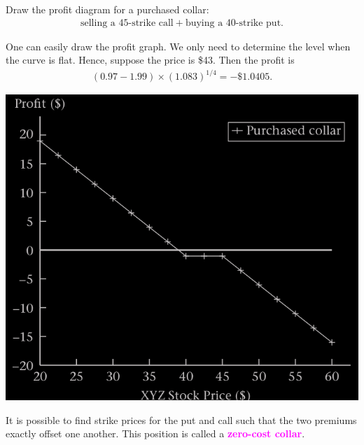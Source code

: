 \begin{frame}[fragile,t]
\begin{myexample}
 	Draw the profit diagram for a purchased collar:
	\begin{align*}
		\text{selling a 45-strike call} + \text{buying a 40-strike put}.
	\end{align*}
\end{myexample}
\pause
\bigskip
\begin{mysol}
	One can easily draw the profit graph. We only need to determine the level when the curve is flat. Hence, 
	suppose the price is \$43. Then the profit is
	\begin{align*}
		(0.97-1.99) \times (1.083)^{1/4} = -\$1.0405.
	\end{align*}
	\bigskip

	\begin{center}
		\includegraphics[scale=0.2]{figs/Figure-3-8.png}
	\end{center}
	\myEnd
\end{mysol}
\end{frame}
\begin{frame}[fragile,t]
It is possible to find strike prices for the put and call such that the two premiums exactly offset one another. This
position is called a \textcolor{magenta}{\bf zero-cost collar}.
\end{frame}
